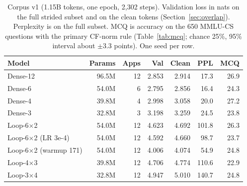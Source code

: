 \begin{table}[t]
\centering
\caption{Corpus v1 (1.15B tokens, one epoch, 2{,}302 steps). Validation loss in nats on the full strided subset and on the clean tokens (Section~\ref{sec:overlap}). Perplexity is on the full subset. MCQ is accuracy on the 650 MMLU-CS questions with the primary CF-norm rule (Table~\ref{tab:mcq}; chance 25\%, 95\% interval about $\pm$3.3 points). One seed per row.}
\label{tab:v1}
\setlength{\tabcolsep}{3pt}
\begin{tabular}{lrrrrrr}
\toprule
Model & Params & Apps & Val & Clean & PPL & MCQ \\
\midrule
Dense-12 & 96.5M & 12 & 2.853 & 2.914 & 17.3 & 26.9 \\
Dense-6 & 54.0M & 6 & 2.795 & 2.856 & 16.4 & 24.3 \\
Dense-4 & 39.8M & 4 & 2.998 & 3.058 & 20.0 & 27.2 \\
Dense-3 & 32.8M & 3 & 3.198 & 3.259 & 24.5 & 23.8 \\
Loop-6$\times$2 & 54.0M & 12 & 4.623 & 4.692 & 101.8 & 26.3 \\
Loop-6$\times$2 (LR 3e-4) & 54.0M & 12 & 4.592 & 4.660 & 98.7 & 23.7 \\
Loop-6$\times$2 (warmup 171) & 54.0M & 12 & 4.006 & 4.074 & 54.9 & 24.8 \\
Loop-4$\times$3 & 39.8M & 12 & 4.706 & 4.774 & 110.6 & 22.9 \\
Loop-3$\times$4 & 32.8M & 12 & 4.947 & 5.010 & 140.7 & 24.8 \\
\bottomrule
\end{tabular}
\end{table}
